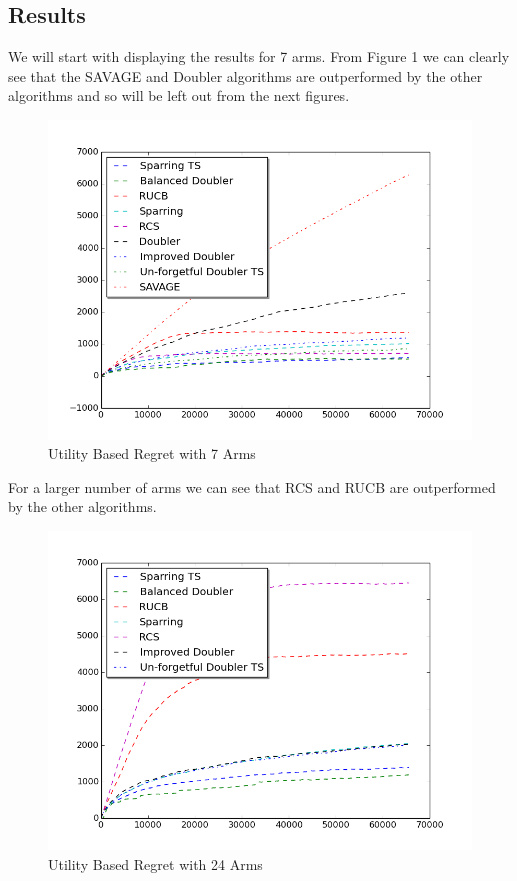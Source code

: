 \documentclass{llncs}
\begin{document}
\subsection{Results}
We will start with displaying the results for 7 arms.
From Figure 1 we can clearly see that the SAVAGE and Doubler algorithms are outperformed by the other algorithms and so will be left out from the next figures.
\begin{figure}[h!]
\centering
  \includegraphics[scale=0.5]{figures/all_MQ2007_7arms.png}
  \caption{Utility Based Regret with 7 Arms}
\end{figure}

For a larger number of arms we can see that RCS and RUCB are outperformed by the other algorithms.

\begin{figure}[h!]
\centering
  \includegraphics[scale=0.5]{figures/all_MQ2007_24arms.png}
  \caption{Utility Based Regret with 24 Arms}
\end{figure}
\end{document}

